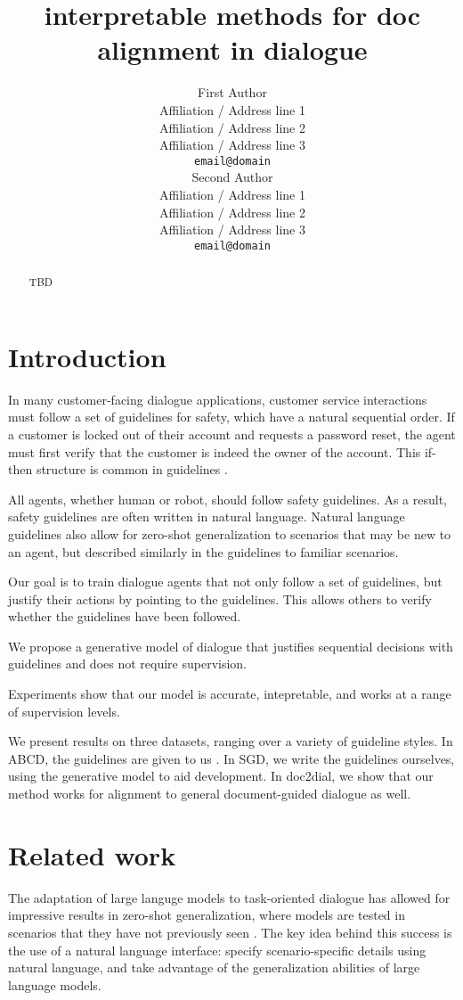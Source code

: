 \documentclass[11pt]{article}
\title{interpretable methods for doc alignment in dialogue}
\author{First Author \\
  Affiliation / Address line 1 \\
  Affiliation / Address line 2 \\
  Affiliation / Address line 3 \\
  \texttt{email@domain} \\\And
  Second Author \\
  Affiliation / Address line 1 \\
  Affiliation / Address line 2 \\
  Affiliation / Address line 3 \\
  \texttt{email@domain} \\}
\begin{document}
\maketitle
\begin{abstract}
TBD
\end{abstract}

\section{Introduction}
In many customer-facing dialogue applications,
customer service interactions must follow a set of guidelines for safety,
which have a natural sequential order.
If a customer is locked out of their account and requests a password reset,
the agent must first verify that the customer is indeed the owner of the account.
This if-then structure is common in guidelines \cite{abcd}.

All agents, whether human or robot, should follow safety guidelines.
As a result, safety guidelines are often written in natural language.
Natural language guidelines also allow for zero-shot generalization to scenarios
that may be new to an agent, but described similarly in the guidelines to
familiar scenarios.

Our goal is to train dialogue agents that not only follow a set of guidelines,
but justify their actions by pointing to the guidelines.
This allows others to verify whether the guidelines have been followed.

We propose a generative model of dialogue
that justifies sequential decisions with guidelines
and does not require supervision.

Experiments show that our model is accurate,
intepretable,
and works at a range of supervision levels.

We present results on three datasets, ranging over a variety of guideline styles.
In ABCD, the guidelines are given to us \citet{abcd}.
In SGD, we write the guidelines ourselves,
using the generative model to aid development.
In doc2dial, we show that our method works for alignment to general document-guided
dialogue as well.

\section{Related work}
The adaptation of large languge models to task-oriented dialogue
has allowed for impressive results in zero-shot generalization,
where models are tested in scenarios that they have not previously seen
\cite{}.
The key idea behind this success is the use of a natural language interface:
specify scenario-specific details using natural language,
and take advantage of the generalization abilities of large language models.
\end{document}
